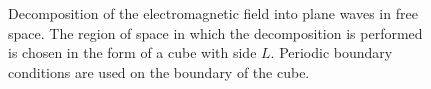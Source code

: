 \begin{figure}
\centering

\caption{Decomposition of the electromagnetic field into plane waves in free
  space. The region of space in which the decomposition is performed
  is chosen in the form of a cube with side
  $L$. Periodic boundary conditions are used on the boundary of the cube.}
\label{figCh1_Vfree}
\end{figure}